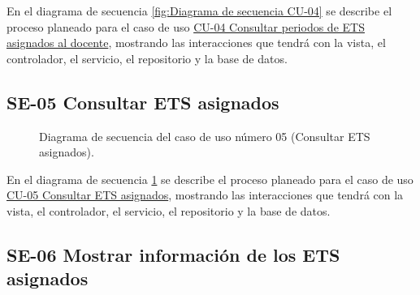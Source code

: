 En el diagrama de secuencia \ref{fig:Diagrama de secuencia CU-04} se describe el proceso planeado para el caso de uso \hyperlink{CU-04}{CU-04 Consultar periodos de ETS asignados al docente}, mostrando las interacciones que tendrá con la vista, el controlador, el servicio, el repositorio y la base de datos.

\newpage

\subsection{SE-05 Consultar ETS asignados}

\begin{figure}[htbp!]
	\begin{center}
		\caption{Diagrama de secuencia del caso de uso número 05 (Consultar ETS asignados).}
		\label{fig:Diagrama de secuencia CU-05}
	\end{center}
\end{figure}

En el diagrama de secuencia \ref{fig:Diagrama de secuencia CU-05} se describe el proceso planeado para el caso de uso \hyperlink{CU-05}{CU-05 Consultar ETS asignados}, mostrando las interacciones que tendrá con la vista, el controlador, el servicio, el repositorio y la base de datos.

\newpage

\subsection{SE-06 Mostrar información de los ETS asignados}

